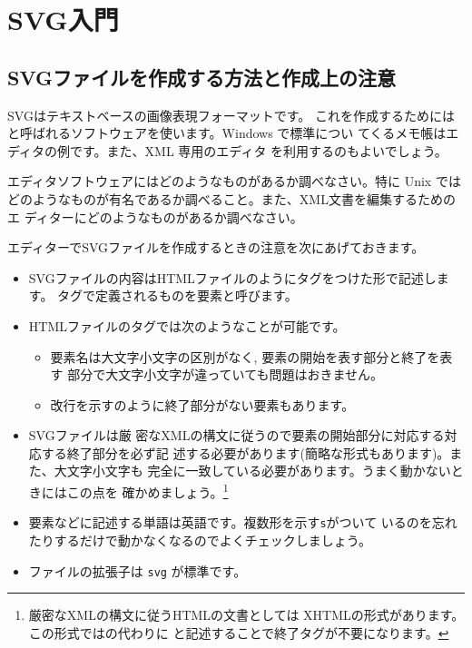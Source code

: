 \chapter{SVG入門}
\section{SVGファイルを作成する方法と作成上の注意}
SVGはテキストベースの画像表現フォーマットです。
これを作成するためには
と呼ばれるソフトウェアを使います。Windows で標準につい
てくるメモ帳はエディタの例です。また、XML 専用のエディタ
を利用するのもよいでしょう。
\begin{Problem}
エディタソフトウェアにはどのようなものがあるか調べなさい。特に Unix では
 どのようなものが有名であるか調べること。また、XML文書を編集するためのエ
 ディターにどのようなものがあるか調べなさい。
\end{Problem}
エディターでSVGファイルを作成するときの注意を次にあげておきます。
\begin{itemize}
 \item SVGファイルの内容はHTMLファイルのようにタグをつけた形で記述します。
       タグで定義されるものを要素と呼びます。
 \item HTMLファイルのタグでは次のようなことが可能です。
\begin{itemize}
 \item 要素名は大文字小文字の区別がなく, 要素の開始を表す部分と終了を表す
       部分で大文字小文字が違っていても問題はおきません。
 \item 改行を示すのように終了部分がない要素もあります。
\end{itemize}
 \item SVGファイルは厳
       密なXMLの構文に従うので要素の開始部分に対応する対応する終了部分を必ず記
       述する必要があります(簡略な形式もあります)。また、大文字小文字も
       完全に一致している必要があります。うまく動かないときにはこの点を
       確かめましょう。\footnote{厳密なXMLの構文に従うHTMLの文書としては
       XHTMLの形式があります。この形式ではの代わりに
        と記述することで終了タグが不要になります。}
 \item 要素などに記述する単語は英語です。複数形を示す\texttt{s}がついて
       いるのを忘れたりするだけで動かなくなるのでよくチェックしましょう。
 \item ファイルの拡張子は \texttt{svg} が標準です。
\end{itemize}

